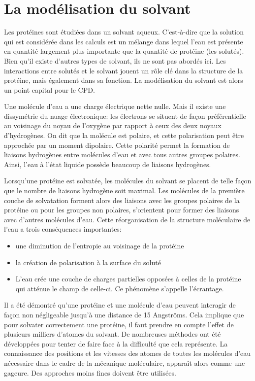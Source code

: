\section{La modélisation du solvant}
Les protéines sont étudiées dans un solvant aqueux. C'est-à-dire que la solution qui est considérée dans les calculs est un mélange dans lequel l'eau est présente en quantité largement plus importante que la quantité de protéine (les solutés). Bien qu'il existe d'autres types de solvant, ils ne sont pas abordés ici. Les interactions entre solutés et le solvant jouent un rôle clé dans la structure de la protéine, mais également dans sa fonction. La modélisation du solvant est alors un point capital pour le CPD.

Une molécule d'eau a une charge électrique nette nulle. Mais il existe une dissymétrie du nuage électronique: les électrons se situent de façon préférentielle au voisinage du noyau de l'oxygène par rapport à ceux des deux noyaux d'hydrogènes.
On dit que la molécule est polaire, et cette polarisation peut être approchée par un moment dipolaire. Cette polarité permet la formation de liaisons hydrogènes entre molécules d'eau et avec tous autres groupes polaires. Ainsi, l'eau à l'état liquide possède beaucoup de liaisons hydrogènes.

Lorsqu'une protéine est solvatée, les molécules du solvant se placent de telle façon que le nombre de liaisons hydrogène soit maximal. Les molécules de la première couche de solvatation forment alors des liaisons avec les groupes polaires de la protéine ou pour les groupes non polaires, s'orientent pour former des liaisons avec d'autres molécules d'eau. Cette réorganisation de la structure moléculaire de l'eau a trois conséquences importantes:

\begin{itemize}
\item une diminution de l'entropie au voisinage de la protéine  
\item la création de polarisation à la surface du soluté
\item  L'eau crée une couche de charges partielles opposées à celles de la protéine qui atténue le champ de celle-ci. Ce phénomène s'appelle l'écrantage.
\end{itemize}
  
Il a été démontré qu'une protéine et une molécule d'eau peuvent interagir de façon non négligeable jusqu'à une distance de 15 Angströms. Cela implique que pour solvater correctement une protéine, il faut prendre en compte l'effet de plusieurs milliers d'atomes du solvant.
De nombreuses méthodes ont été développées pour tenter de faire face à la difficulté que cela représente.
La connaissance des positions et les vitesses des atomes de toutes les molécules d'eau nécessaire dans le cadre de la mécanique moléculaire, apparaît alors comme une gageure. Des approches moins fines doivent être utilisées. 

